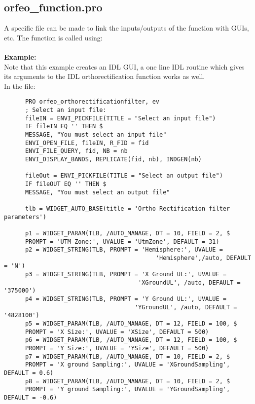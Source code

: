 \subsection{orfeo\_function.pro}
A specific file can be made to link the inputs/outputs of the function with GUIs, etc.
The function is called using:\\
\\
\textbf{Example:}\\
      Note that this example creates an IDL GUI, a one line IDL routine which gives its arguments to the IDL orthorectification function works as well.\\
      In the  file:\\
\begin{verbatim}
      PRO orfeo_orthorectificationfilter, ev
      ; Select an input file:
      fileIN = ENVI_PICKFILE(TITLE = "Select an input file")
      IF fileIN EQ '' THEN $
      MESSAGE, "You must select an input file"
      ENVI_OPEN_FILE, fileIN, R_FID = fid
      ENVI_FILE_QUERY, fid, NB = nb
      ENVI_DISPLAY_BANDS, REPLICATE(fid, nb), INDGEN(nb)

      fileOut = ENVI_PICKFILE(TITLE = "Select an output file")
      IF fileOUT EQ '' THEN $
      MESSAGE, "You must select an output file"

      tlb = WIDGET_AUTO_BASE(title = 'Ortho Rectification filter parameters')

      p1 = WIDGET_PARAM(TLB, /AUTO_MANAGE, DT = 10, FIELD = 2, $
      PROMPT = 'UTM Zone:', UVALUE = 'UtmZone', DEFAULT = 31)
      p2 = WIDGET_STRING(TLB, PROMPT = 'Hemisphere:', UVALUE =
                                           'Hemisphere',/auto, DEFAULT = 'N')
      p3 = WIDGET_STRING(TLB, PROMPT = 'X Ground UL:', UVALUE =
                                      'XGroundUL', /auto, DEFAULT = '375000')
      p4 = WIDGET_STRING(TLB, PROMPT = 'Y Ground UL:', UVALUE =
                                     'YGroundUL', /auto, DEFAULT = '4828100')
      p5 = WIDGET_PARAM(TLB, /AUTO_MANAGE, DT = 12, FIELD = 100, $
      PROMPT = 'X Size:', UVALUE = 'XSize', DEFAULT = 500)
      p6 = WIDGET_PARAM(TLB, /AUTO_MANAGE, DT = 12, FIELD = 100, $
      PROMPT = 'Y Size:', UVALUE = 'YSize', DEFAULT = 500)
      p7 = WIDGET_PARAM(TLB, /AUTO_MANAGE, DT = 10, FIELD = 2, $
      PROMPT = 'X ground Sampling:', UVALUE = 'XGroundSampling', DEFAULT = 0.6)
      p8 = WIDGET_PARAM(TLB, /AUTO_MANAGE, DT = 10, FIELD = 2, $
      PROMPT = 'Y ground Sampling:', UVALUE = 'YGroundSampling', DEFAULT = -0.6)


\end{verbatim}
